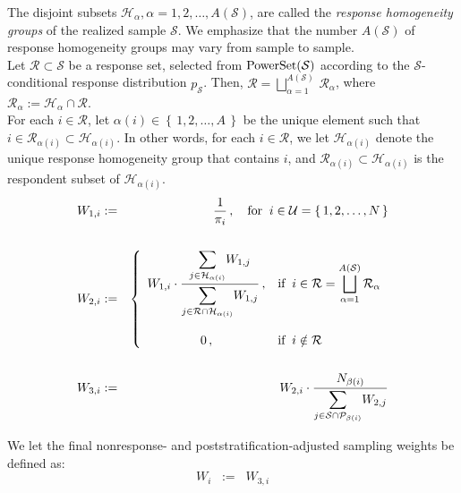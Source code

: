 The disjoint subsets $\mathcal{H}_{\alpha}, \alpha=1,2,\ldots,A(\mathcal{S})$, are called the \emph{response homogeneity groups} of the realized sample $\mathcal{S}$.  We emphasize that the number $A(\mathcal{S})$ of response homogeneity groups may vary from sample to sample. \\

Let $\mathcal{R} \subset \mathcal{S}$ be a response set, selected from $\textnormal{PowerSet}(\mathcal{S})$ according to the $\mathcal{S}$-conditional response distribution $p_{\mathcal{S}}$.  Then, $\mathcal{R} = \displaystyle{\bigsqcup_{\alpha=1}^{A(\mathcal{S})}}\,\mathcal{R} _{\alpha}$, where $\mathcal{R}_{\alpha} := \mathcal{H}_{\alpha}\cap\mathcal{R}$. \\

For each $i \in \mathcal{R}$, let $\alpha(i) \in \left\{\,1,2,\ldots,A\,\right\}$ be the unique element such that $i \in \mathcal{R}_{\alpha(i)} \subset  \mathcal{H}_{\alpha(i)}$.  In other words, for each $i \in \mathcal{R}$, we let $\mathcal{H}_{\alpha(i)}$ denote the unique response homogeneity group that contains $i$, and $\mathcal{R}_{\alpha(i)} \subset \mathcal{H}_{\alpha(i)}$ is the respondent subset of $\mathcal{H}_{\alpha(i)}$. \\

\begin{eqnarray*}
W_{1,i} & := & \dfrac{1}{\pi_{i}}\,, \quad\textnormal{for}\;\; i \in \mathcal{U} = \left\{\,1,2,\ldots,N\,\right\} \\ \\
W_{2,i} & := &
\left\{\begin{array}{cl}
W_{1,i}\cdot\dfrac{\displaystyle{\sum_{j\in \mathcal{H}_{\alpha(i)}}} W_{1,j}}{\displaystyle{\sum_{j\in\mathcal{R}\cap\mathcal{H}_{\alpha(i)}}} W_{1,j}}\,, & \textnormal{if} \;\; i \in \mathcal{R} = \displaystyle{\bigsqcup_{\alpha=1}^{A(\mathcal{S})}}\,\mathcal{R}_{\alpha}
\\ \\
0\,,& \textnormal{if} \;\; i \notin \mathcal{R}
\end{array}\right.
\\ \\
W_{3,i} & := &
W_{2,i}\cdot\dfrac{N_{\beta(i)}}{\displaystyle{\sum_{j\in\mathcal{S}\cap\mathcal{P}_{\beta(i)}}} W_{2,j}}
\end{eqnarray*}

\noindent
We let the final nonresponse- and poststratification-adjusted sampling weights be defined as:
\begin{equation*}
W_{i} \;\; := \;\;  W_{3,i}
\end{equation*}

